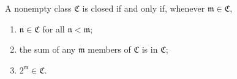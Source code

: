 A nonempty class $\mathfrak{C}$ is closed if and only if, whenever $\mathfrak{m} \in \mathfrak{C}$,
\begin{enumerate}
\item[(i)] $\mathfrak{n} \in \mathfrak{C}$ for all $\mathfrak{n} < \mathfrak{m}$;
\item[(ii)] the sum of any $\mathfrak{m}$ members of $\mathfrak{C}$ is in $\mathfrak{C}$;
\item[(iii)] $2^{\mathfrak{m}} \in \mathfrak{C}$.
\end{enumerate}